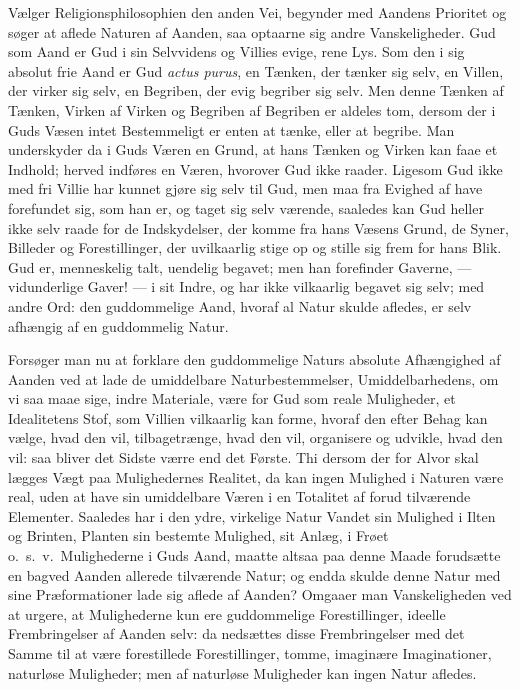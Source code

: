 \documentclass[12pt]{book}
\begin{document}
Vælger Religionsphilosophien den anden Vei, begynder med Aandens
Prioritet og søger at aflede Naturen af Aanden, saa optaarne sig
andre Vanskeligheder. Gud som Aand er Gud i sin Selvvidens og
Villies evige, rene
Lys. Som den i sig absolut frie Aand er Gud \textit{actus purus},
en Tænken, der tænker sig selv, en Villen, der virker sig selv, en
Begriben, der evig begriber sig selv. Men denne Tænken af Tænken,
Virken af Virken og Begriben af Begriben er aldeles tom, dersom der
i Guds Væsen intet Bestemmeligt er enten at tænke, eller at begribe.
Man underskyder da i Guds Væren en Grund, at hans Tænken og Virken
kan faae et Indhold; herved indføres en Væren, hvorover Gud ikke
raader. Ligesom Gud ikke med fri Villie har kunnet gjøre sig selv
til Gud, men maa fra Evighed af have forefundet sig, som han er, og
taget sig selv værende, saaledes kan Gud heller ikke selv raade for
de Indskydelser, der komme fra hans Væsens Grund, de Syner, Billeder
og Forestillinger, der uvilkaarlig stige op og stille sig frem for
hans Blik. Gud er, menneskelig talt, uendelig begavet; men han
forefinder Gaverne, --- vidunderlige Gaver! --- i sit Indre, og har
ikke vilkaarlig begavet sig selv; med andre Ord: den guddommelige
Aand, hvoraf al Natur skulde afledes, er selv afhængig af en
guddommelig Natur.

Forsøger man nu at forklare den guddommelige Naturs absolute
Afhængighed af Aanden ved at lade de umiddelbare Naturbestemmelser,
Umiddelbarhedens, om vi saa maae sige, indre Materiale, være for Gud
som reale Muligheder, et Idealitetens Stof, som Villien vilkaarlig
kan forme, hvoraf den efter Behag kan vælge, hvad den vil,
tilbagetrænge, hvad den vil, organisere og udvikle, hvad den vil:
saa bliver det Sidste værre end det Første. Thi dersom der for
Alvor skal lægges Vægt paa Mulighedernes Realitet, da kan ingen
Mulighed i Naturen være real, uden at have sin umiddelbare Væren i
en Totalitet af forud tilværende Elementer. Saaledes har i den ydre,
virkelige Natur Vandet sin Mulighed i Ilten og Brinten, Planten sin
bestemte Mulighed, sit Anlæg, i Frøet o.\ s.\ v.\ Mulighederne i
Guds Aand, maatte altsaa
paa denne Maade forudsætte en bagved Aanden allerede tilværende
Natur; og endda skulde denne Natur med sine Præformationer lade sig
aflede af Aanden? Omgaaer man Vanskeligheden ved at urgere, at
Mulighederne kun ere guddommelige Forestillinger, ideelle
Frembringelser af Aanden selv: da nedsættes disse Frembringelser med
det Samme til at være forestillede Forestillinger, tomme, imaginære
Imaginationer, naturløse Muligheder; men af naturløse Muligheder kan
ingen Natur afledes.
\end{document}
